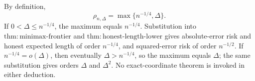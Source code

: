 By definition,
\[
 \rho_{n,\Delta}=\max\{n^{-1/4},\Delta\}.
\]
If \(0<\Delta\leq n^{-1/4}\), the maximum equals \(n^{-1/4}\).  Substitution into \(\mathrm{thm:minimax\text{-}frontier}\) and \(\mathrm{thm:honest\text{-}length\text{-}lower}\) gives absolute-error risk and honest expected length of order \(n^{-1/4}\), and squared-error risk of order \(n^{-1/2}\).  If \(n^{-1/4}=o(\Delta)\), then eventually \(\Delta>n^{-1/4}\), so the maximum equals \(\Delta\); the same substitution gives orders \(\Delta\) and \(\Delta^2\).  No exact-coordinate theorem is invoked in either deduction.